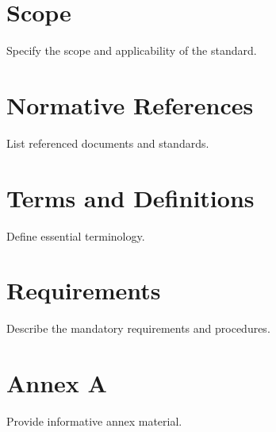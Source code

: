 \documentclass[
    language=english,
    doctype=standard,
    institution=none,
    titlestyle=book,
    oneside,
]{../../omnilatex}
\begin{document}
\maketitle

\tableofcontents

\section{Scope}
Specify the scope and applicability of the standard.

\section{Normative References}
List referenced documents and standards.

\section{Terms and Definitions}
Define essential terminology.

\section{Requirements}
Describe the mandatory requirements and procedures.

\appendix
\section{Annex A}
Provide informative annex material.
\end{document}
